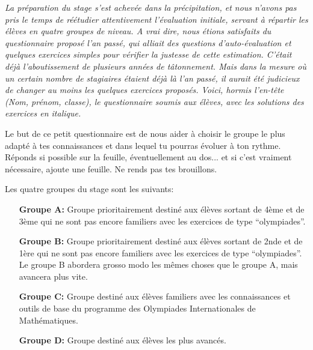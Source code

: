 \emph{La préparation du stage s'est achevée dans la précipitation, et nous n'avons pas pris le temps de réétudier attentivement l'évaluation initiale, servant à répartir les élèves en quatre groupes de niveau. A vrai dire, nous étions satisfaits du questionnaire proposé l'an passé, qui alliait des questions d'auto-évaluation et quelques exercices simples pour vérifier la justesse de cette estimation. C'était déjà l'aboutissement de plusieurs années de tâtonnement. Mais dans la mesure où un certain nombre de stagiaires étaient déjà là l'an passé, il aurait été judicieux de changer au moins les quelques exercices proposés. Voici, hormis l'en-tête (Nom, prénom, classe), le questionnaire soumis aux élèves, avec les solutions des exercices en italique.}






\medskip

Le but de ce petit questionnaire est de nous aider à choisir le groupe le plus adapté à tes connaissances et dans lequel tu pourras évoluer à ton rythme. Réponds si possible sur la feuille, éventuellement au dos... et si c'est vraiment nécessaire, ajoute une feuille. Ne rends pas tes brouillons.




Les quatre groupes du stage sont les suivants:

\begin{enumerate}
\item[\textbf{Groupe A:}] Groupe prioritairement destiné aux élèves sortant de 4ème et de 3ème qui ne sont pas encore familiers avec les exercices de type ``olympiades''.
\item[\textbf{Groupe B:}] Groupe prioritairement destiné aux élèves sortant de 2nde et de 1ère qui ne sont pas encore familiers avec les exercices de type ``olympiades''. Le groupe B abordera grosso modo les mêmes choses que le groupe A, mais avancera plus vite.
\item[\textbf{Groupe C:}] Groupe destiné aux élèves familiers avec les connaissances et outils de base du programme des Olympiades Internationales de Mathématiques.
\item[\textbf{Groupe D:}] Groupe destiné aux élèves les plus avancés.
\end{enumerate}
\ligne

